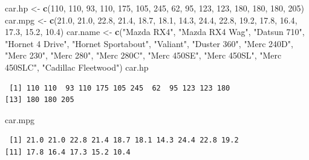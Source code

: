 \documentclass[
]{krantz}
\makeatletter
\newenvironment{Shaded}{\begin{snugshade}}{\end{snugshade}}
\newcommand{\DecValTok}[1]{\textcolor[rgb]{0.06,0.06,0.06}{#1}}
\newcommand{\FloatTok}[1]{\textcolor[rgb]{0.06,0.06,0.06}{#1}}
\newcommand{\KeywordTok}[1]{\textcolor[rgb]{0.27,0.27,0.27}{\textbf{#1}}}
\newcommand{\NormalTok}[1]{#1}
\newcommand{\StringTok}[1]{\textcolor[rgb]{0.5,0.5,0.5}{#1}}
\newenvironment{kframe}{%
\medskip{}
\setlength{\fboxsep}{.8em}
 \def\at@end@of@kframe{}%
 \ifinner\ifhmode%
  \def\at@end@of@kframe{\end{minipage}}%
  \begin{minipage}{\columnwidth}%
 \fi\fi%
 \def\FrameCommand##1{\hskip\@totalleftmargin \hskip-\fboxsep
 \colorbox{shadecolor}{##1}\hskip-\fboxsep
     \hskip-\linewidth \hskip-\@totalleftmargin \hskip\columnwidth}%
 \MakeFramed {\advance\hsize-\width
   \@totalleftmargin\z@ \linewidth\hsize
   \@setminipage}}%
 {\par\unskip\endMakeFramed%
 \at@end@of@kframe}
\renewenvironment{Shaded}{\begin{kframe}}{\end{kframe}}
\makeatother
\begin{document}
\begin{Shaded}
\begin{Highlighting}[]
\NormalTok{car.hp \textless{}{-}}\StringTok{ }\KeywordTok{c}\NormalTok{(}\DecValTok{110}\NormalTok{, }\DecValTok{110}\NormalTok{, }\DecValTok{93}\NormalTok{, }\DecValTok{110}\NormalTok{, }\DecValTok{175}\NormalTok{, }\DecValTok{105}\NormalTok{, }\DecValTok{245}\NormalTok{, }\DecValTok{62}\NormalTok{, }\DecValTok{95}\NormalTok{, }\DecValTok{123}\NormalTok{, }
\DecValTok{123}\NormalTok{, }\DecValTok{180}\NormalTok{, }\DecValTok{180}\NormalTok{, }\DecValTok{180}\NormalTok{, }\DecValTok{205}\NormalTok{)}
\NormalTok{car.mpg \textless{}{-}}\StringTok{ }\KeywordTok{c}\NormalTok{(}\FloatTok{21.0}\NormalTok{, }\FloatTok{21.0}\NormalTok{, }\FloatTok{22.8}\NormalTok{, }\FloatTok{21.4}\NormalTok{, }\FloatTok{18.7}\NormalTok{, }\FloatTok{18.1}\NormalTok{, }\FloatTok{14.3}\NormalTok{, }\FloatTok{24.4}\NormalTok{, }
	     \FloatTok{22.8}\NormalTok{, }\FloatTok{19.2}\NormalTok{, }\FloatTok{17.8}\NormalTok{, }\FloatTok{16.4}\NormalTok{, }\FloatTok{17.3}\NormalTok{, }\FloatTok{15.2}\NormalTok{, }\FloatTok{10.4}\NormalTok{)}
\NormalTok{car.name \textless{}{-}}\StringTok{ }\KeywordTok{c}\NormalTok{(}\StringTok{"Mazda RX4"}\NormalTok{, }\StringTok{"Mazda RX4 Wag"}\NormalTok{, }\StringTok{"Datsun 710"}\NormalTok{, }
              \StringTok{"Hornet 4 Drive"}\NormalTok{, }\StringTok{"Hornet Sportabout"}\NormalTok{, }\StringTok{"Valiant"}\NormalTok{, }
              \StringTok{"Duster 360"}\NormalTok{, }\StringTok{"Merc 240D"}\NormalTok{, }\StringTok{"Merc 230"}\NormalTok{, }\StringTok{"Merc 280"}\NormalTok{, }
              \StringTok{"Merc 280C"}\NormalTok{, }\StringTok{"Merc 450SE"}\NormalTok{, }\StringTok{"Merc 450SL"}\NormalTok{, }
              \StringTok{"Merc 450SLC"}\NormalTok{, }\StringTok{"Cadillac Fleetwood"}\NormalTok{)}
\NormalTok{car.hp}
\end{Highlighting}
\end{Shaded}

\begin{verbatim}
 [1] 110 110  93 110 175 105 245  62  95 123 123 180
[13] 180 180 205
\end{verbatim}

\begin{Shaded}
\begin{Highlighting}[]
\NormalTok{car.mpg}
\end{Highlighting}
\end{Shaded}

\begin{verbatim}
 [1] 21.0 21.0 22.8 21.4 18.7 18.1 14.3 24.4 22.8 19.2
[11] 17.8 16.4 17.3 15.2 10.4
\end{verbatim}
\end{document}
